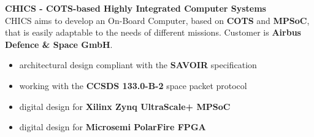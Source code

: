 \documentclass[letterpaper]{twentysecondcv} %
\begin{document}
\begin{twenty}
{            \vspace{1 mm}
            \textbf{CHICS - COTS-based Highly Integrated Computer Systems}\\
            CHICS aims to develop an On-Board Computer, based on \textbf{COTS} and
            \textbf{MPSoC}, that is easily adaptable to the needs of
            different missions. Customer is \textbf{Airbus Defence \& Space GmbH}.
            \vspace{1 mm}
            \begin{itemize}
                \item architectural design compliant with the \textbf{SAVOIR} specification
                \item working with the \textbf{CCSDS 133.0-B-2} space packet protocol
                \item digital design for \textbf{Xilinx Zynq UltraScale+ MPSoC}
                \item digital design for \textbf{Microsemi PolarFire FPGA}
            \end{itemize}

}
\end{twenty}
\end{document}
